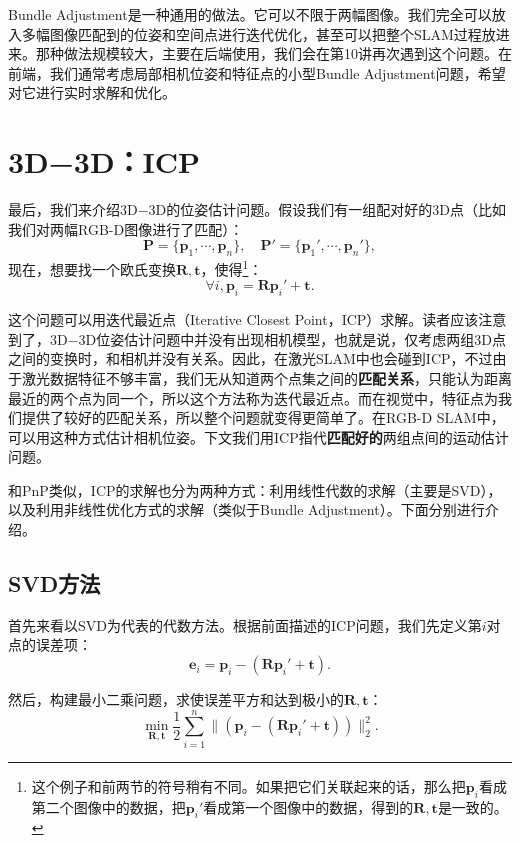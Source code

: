Bundle Adjustment是一种通用的做法。它可以不限于两幅图像。我们完全可以放入多幅图像匹配到的位姿和空间点进行迭代优化，甚至可以把整个SLAM过程放进来。那种做法规模较大，主要在后端使用，我们会在第10讲再次遇到这个问题。在前端，我们通常考虑局部相机位姿和特征点的小型Bundle Adjustment问题，希望对它进行实时求解和优化。

\section{3D−3D：ICP}
最后，我们来介绍3D−3D的位姿估计问题。假设我们有一组配对好的3D点（比如我们对两幅RGB-D图像进行了匹配）：
\[
\bm{P} = \{ \bm{p}_1, \cdots, \bm{p}_n \}, \quad \bm{P}' = \{ \bm{p}_1', \cdots, \bm{p}_n'\},
\]
现在，想要找一个欧氏变换$\bm{R}, \bm{t}$，使得\footnote{这个例子和前两节的符号稍有不同。如果把它们关联起来的话，那么把$\bm{p}_i$看成第二个图像中的数据，把$\bm{p}_i'$看成第一个图像中的数据，得到的$\bm{R},\bm{t}$是一致的。}：
\[
\forall i, \bm{p}_i = \bm{R} \bm{p}_i' + \bm{t}.
\]

这个问题可以用迭代最近点（Iterative Closest Point，ICP）求解。读者应该注意到了，3D−3D位姿估计问题中并没有出现相机模型，也就是说，仅考虑两组3D点之间的变换时，和相机并没有关系。因此，在激光SLAM中也会碰到ICP，不过由于激光数据特征不够丰富，我们无从知道两个点集之间的\textbf{匹配关系}，只能认为距离最近的两个点为同一个，所以这个方法称为迭代最近点。而在视觉中，特征点为我们提供了较好的匹配关系，所以整个问题就变得更简单了。在RGB-D SLAM中，可以用这种方式估计相机位姿。下文我们用ICP指代\textbf{匹配好的}两组点间的运动估计问题。

和PnP类似，ICP的求解也分为两种方式：利用线性代数的求解（主要是SVD）， 以及利用非线性优化方式的求解（类似于Bundle Adjustment）。下面分别进行介绍。

\subsection{SVD方法}
首先来看以SVD为代表的代数方法。根据前面描述的ICP问题，我们先定义第$i$对点的误差项：
\begin{equation}
\bm{e}_i = \bm{p}_i - (\bm{R} \bm{p}_i' + \bm{t} ) .
\end{equation}

然后，构建最小二乘问题，求使误差平方和达到极小的$\bm{R}, \bm{t}$：
\begin{equation}
\mathop {\min }\limits_{\bm{R}, \bm{t}} \frac{1}{2} \sum\limits_{i = 1}^n\| {\left( {{\bm{p}_i} - \left( {\bm{R}{\bm{p}_i}' + \bm{t}} \right)} \right)} \|^2_2.
\end{equation}

